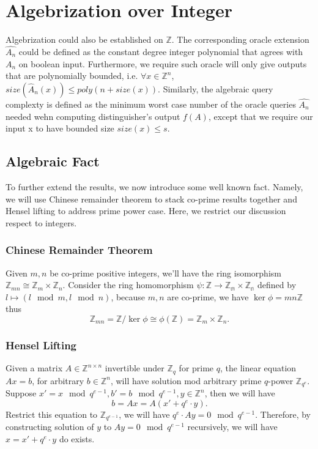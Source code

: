 \documentclass{article}
\begin{document}
\section{Algebrization over Integer}
Algebrization could also be established on $\mathbb{Z}$. The corresponding oracle extension $\hat{A_n}$ could be defined as the constant degree integer polynomial that agrees with $A_n$ on boolean input. Furthermore, we require such oracle will only give outputs that are polynomially bounded, i.e. $\forall x\in\mathbb{Z}^n$, $size(\hat{A}_n(x))\leq poly(n+size(x))$. Similarly, the algebraic query complexty  is defined as the minimum worst case number of the oracle queries $\hat{A_n}$ needed wehn computing distinguisher's output $f(A)$, except that we require our input x to have bounded size $size(x)\leq s$.

\subsection{Algebraic Fact}
To further extend the results, we now introduce some well known fact. Namely, we will use Chinese remainder theorem to stack co-prime results together and Hensel lifting to address prime power case. Here, we restrict our discussion respect to integers.

\subsubsection{Chinese Remainder Theorem}
Given $m,n$ be co-prime positive integers, we'll have the ring isomorphism $\mathbb{Z}_{mn}\cong \mathbb{Z}_m\times \mathbb{Z}_n$. Consider the ring homomorphism $\psi:\mathbb{Z}\rightarrow \mathbb{Z_m}\times\mathbb{Z_n}$ defined by $l\mapsto (l\mod m, l\mod n)$, because $m,n$ are co-prime, we have $\ker\phi=mn\mathbb{Z}$ thus
$$
\mathbb{Z}_{mn}=\mathbb{Z}/\ker\phi\cong \phi(\mathbb{Z})=\mathbb{Z}_m\times\mathbb{Z}_n.
$$
\subsubsection{Hensel Lifting}
Given a matrix $A\in\mathbb{Z}^{n\times n}$ invertible under $\mathbb{Z}_q$ for prime $q$, the linear equation $Ax=b$, for arbitrary $b\in\mathbb{Z}^n$, will have solution mod arbitrary prime $q$-power $\mathbb{Z}_{q^e}$. Suppose $x'=x\mod q^{e-1}, b'=b\mod q^{e-1}, y\in\mathbb{Z}^n$, then we will have
$$
b=Ax=A(x'+q^e\cdot y).
$$
Restrict this equation to $\mathbb{Z}_{q^{e-1}}$, we will have $q^e\cdot A y=0\mod q^{e-1}$. Therefore, by constructing solution of $y$ to $Ay=0\mod q^{e-1}$ recursively, we will have $x=x'+q^e \cdot y$ do exists.
\end{document}
